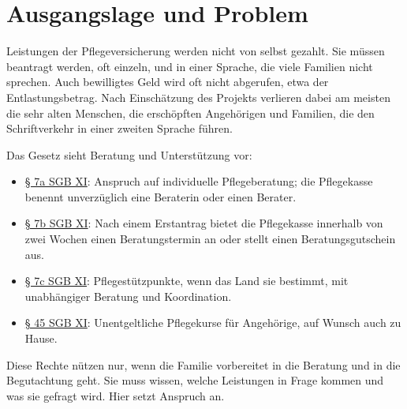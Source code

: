 \documentclass[11pt,a4paper,parskip=half-]{scrartcl}
\begin{document}
\section{Ausgangslage und Problem}
%
Leistungen der Pflegeversicherung werden nicht von selbst gezahlt.
Sie müssen beantragt werden, oft einzeln, und in einer Sprache, die viele Familien nicht sprechen.
Auch bewilligtes Geld wird oft nicht abgerufen, etwa der Entlastungsbetrag.
Nach Einschätzung des Projekts verlieren dabei am meisten die sehr alten Menschen, die erschöpften Angehörigen und Familien,
die den Schriftverkehr in einer zweiten Sprache führen.

Das Gesetz sieht Beratung und Unterstützung vor:
\begin{itemize}
  \item \href{https://www.gesetze-im-internet.de/sgb_11/__7a.html}{§ 7a SGB XI}:
        Anspruch auf individuelle Pflegeberatung; die Pflegekasse benennt unverzüglich
        eine Beraterin oder einen Berater.
  \item \href{https://www.gesetze-im-internet.de/sgb_11/__7b.html}{§ 7b SGB XI}:
        Nach einem Erstantrag bietet die Pflegekasse innerhalb von zwei Wochen einen
        Beratungstermin an oder stellt einen Beratungsgutschein aus.
  \item \href{https://www.gesetze-im-internet.de/sgb_11/__7c.html}{§ 7c SGB XI}:
        Pflegestützpunkte, wenn das Land sie bestimmt, mit unabhängiger Beratung und Koordination.
  \item \href{https://www.gesetze-im-internet.de/sgb_11/__45.html}{§ 45 SGB XI}:
        Unentgeltliche Pflegekurse für Angehörige, auf Wunsch auch zu Hause.
\end{itemize}
Diese Rechte nützen nur, wenn die Familie vorbereitet in die Beratung und in die Begutachtung geht.
Sie muss wissen, welche Leistungen in Frage kommen und was sie gefragt wird.
Hier setzt Anspruch an.

\end{document}
